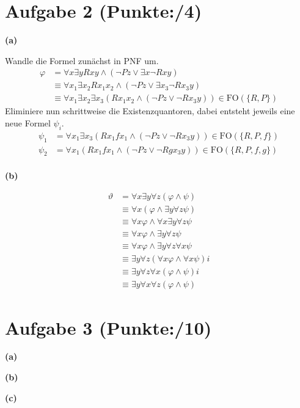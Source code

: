 \documentclass[11pt, a4paper]{article}
\newcommand{\p}{4}
\newcommand{\pp}{10}
\begin{document}
\section*{Aufgabe 2 (Punkte:\qquad/\p)}
\textbf{(a)}
\begin{adjustwidth}{20pt}{20pt}
Wandle die Formel zunächst in PNF um.
\begin{align*}
	\varphi &= \forall x \exists yRxy \wedge (\neg Pz \vee \exists x\neg Rxy) \\
		&\equiv \forall x_1 \exists x_2Rx_1x_2 \wedge (\neg Pz \vee \exists x_3\neg Rx_3y)\\
		&\equiv \forall x_1 \exists x_2 \exists x_3(Rx_1x_2 \wedge(\neg Pz \vee \neg Rx_3y)) \in \text{FO}(\{ R,P\})
\end{align*}
Eliminiere nun schrittweise die Existenzquantoren, dabei entsteht jeweils eine neue Formel $\psi_i$.
\begin{align*}
	\psi_1 &= \forall x_1 \exists x_3(Rx_1fx_1 \wedge (\neg Pz \vee \neg Rx_3y))  \in \text{FO}(\{ R,P, f\}) \\
	\psi_2 &= \forall x_1(Rx_1fx_1 \wedge (\neg Pz \vee \neg Rgx_3y))  \in \text{FO}(\{ R,P,f,g\}) \\
\end{align*}
\end{adjustwidth}
\textbf{(b)}
\begin{adjustwidth}{20pt}{20pt}\vspace{-\baselineskip}
\begin{align*}
	\vartheta &= \forall x\exists y \forall z(\varphi \wedge \psi) \\
		&\equiv \forall x(\varphi \wedge \exists y \forall z \psi) \\
		&\equiv \forall x \varphi \wedge \forall x\exists y \forall z \psi \\
		&\equiv \forall x \varphi \wedge \exists y \forall z \psi \\
		&\equiv \forall x \varphi \wedge \exists y \forall z \forall x \psi \\
		&\equiv \exists y \forall z(\forall x \varphi \wedge \forall x \psi)i \\
		&\equiv \exists y\forall z \forall x(\varphi \wedge \psi)i \\
		&\equiv \exists y\forall x \forall z(\varphi \wedge \psi)
\end{align*}
\end{adjustwidth}


\section*{Aufgabe 3 (Punkte:\qquad/\pp)}
\textbf{(a)}
\begin{adjustwidth}{20pt}{20pt}

\end{adjustwidth}
\textbf{(b)}
\begin{adjustwidth}{20pt}{20pt}

\end{adjustwidth}
\textbf{(c)}
\begin{adjustwidth}{20pt}{20pt}

\end{adjustwidth}
\end{document}
